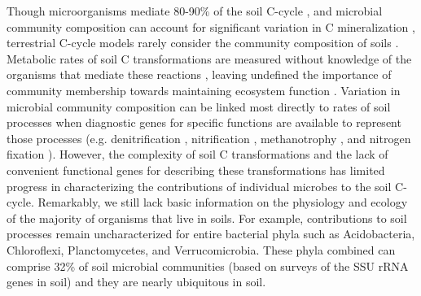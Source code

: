 Though microorganisms mediate 80-90\% of the soil C-cycle
\citep{ColemanCrossley_1996,Nannipieri_2003}, and microbial community
composition can account for significant variation in C mineralization
\citep{Strickland_2009} , terrestrial C-cycle models rarely consider the
community composition of soils \citep{Zak2006,Reed2007}. Metabolic rates of
soil C transformations are measured without knowledge of the organisms that
mediate these reactions \citep{Nannipieri_2003}, leaving undefined the
importance of community membership towards maintaining ecosystem function
\citep{Nannipieri_2003,Schimel_2012,Allison_2008}. Variation in microbial
community composition can be linked most directly to rates of soil processes
when diagnostic genes for specific functions are available to represent those
processes (e.g. denitrification \citep{Cavigelli2000}, nitrification
\citep{Carney2004,Hawkes2005,Webster2005}, methanotrophy \citep{Gulledge1997},
and nitrogen fixation \citep{Hsu2009}). However, the complexity of soil
C transformations and the lack of convenient functional genes for describing
these transformations has limited progress in characterizing the contributions
of individual microbes to the soil C-cycle. Remarkably, we still lack basic
information on the physiology and ecology of the majority of organisms that
live in soils. For example, contributions to soil processes remain
uncharacterized for entire bacterial phyla such as Acidobacteria, Chloroflexi,
Planctomycetes, and Verrucomicrobia. These phyla combined can comprise 32\% of
soil microbial communities (based on surveys of the SSU rRNA genes in soil)
\citep{Janssen2006,Buckley2002} and they are nearly ubiquitous in soil. 


